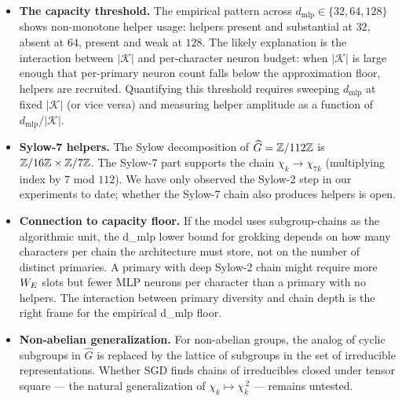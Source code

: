 \begin{itemize}
\item \textbf{The capacity threshold.} The empirical pattern across
  $d_{\text{mlp}} \in \{32, 64, 128\}$ shows non-monotone helper usage:
  helpers present and substantial at $32$, absent at $64$, present and
  weak at $128$. The likely explanation is the interaction between
  $|\mathcal{K}|$ and per-character neuron budget: when $|\mathcal{K}|$
  is large enough that per-primary neuron count falls below the
  approximation floor, helpers are recruited. Quantifying this
  threshold requires sweeping $d_{\text{mlp}}$ at fixed $|\mathcal{K}|$
  (or vice versa) and measuring helper amplitude as a function of
  $d_{\text{mlp}} / |\mathcal{K}|$.

\item \textbf{Sylow-7 helpers.} The Sylow decomposition of
  $\widehat{G} = \mathbb{Z}/112\mathbb{Z}$ is $\mathbb{Z}/16\mathbb{Z} \times \mathbb{Z}/7\mathbb{Z}$. The Sylow-7 part
  supports the chain $\chi_k \to \chi_{7k}$ (multiplying index by $7$
  mod $112$). We have only observed the Sylow-2 step in our experiments
  to date; whether the Sylow-7 chain also produces helpers is open.

\item \textbf{Connection to capacity floor.} If the model uses
  subgroup-chains as the algorithmic unit, the d\_mlp lower bound for
  grokking depends on how many characters per chain the architecture
  must store, not on the number of distinct primaries. A primary
  with deep Sylow-2 chain might require more $W_E$ slots but fewer MLP
  neurons per character than a primary with no helpers. The interaction
  between primary diversity and chain depth is the right frame for the
  empirical d\_mlp floor.

\item \textbf{Non-abelian generalization.} For non-abelian groups, the
  analog of cyclic subgroups in $\widehat{G}$ is replaced by the lattice
  of subgroups in the set of irreducible representations. Whether SGD
  finds chains of irreducibles closed under tensor square --- the
  natural generalization of $\chi_k \mapsto \chi_k^{\,2}$ ---
  remains untested.
\end{itemize}
